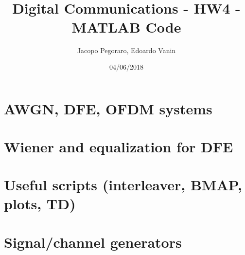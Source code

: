 \documentclass[a4paper,11.5pt]{article}
\title{Digital Communications - HW4 - MATLAB Code}
\author{Jacopo Pegoraro, Edoardo Vanin}
\date{04/06/2018}
\begin{document}
\maketitle 

\section*{AWGN, DFE, OFDM systems}






\section*{Wiener and equalization for DFE}



\section*{Useful scripts (interleaver, BMAP, plots, TD)}









\section*{Signal/channel generators}




\end{document}
